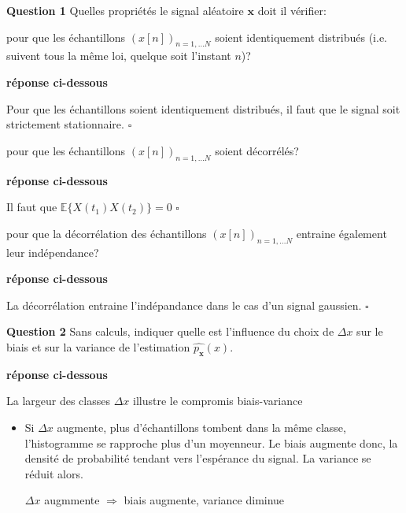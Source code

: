 \documentclass{article}
\newcommand{\debutrep}[1]{\color{blue}\begin{center} \hrulefill \textbf{ #1 } \hrulefill \end{center} }
\newcommand{\finrep}{\vspace*{5mm}\hfill $\square$\color{black}\vspace*{5mm}}
\begin{document}
\begin{list}{}{\setlength{\leftmargin}{2mm} \setlength{\labelwidth}{0mm} \setlength{\labelsep}{3mm} \setlength{\itemsep}{1mm} }
\item[\textbf{Question 1}] Quelles propriétés le signal aléatoire $\mathbf{x}$ doit il vérifier:
\begin{list}{-}{\setlength{\leftmargin}{3mm} \setlength{\labelwidth}{20mm} \setlength{\labelsep}{2mm} \setlength{\itemsep}{1mm} }
\item   pour que les échantillons  $\left(x[n]\right)_{n=1,\ldots N}$ soient identiquement distribués (i.e. suivent tous la même loi, quelque soit l'instant $n$)?

\debutrep{réponse ci-dessous}
Pour que les échantillons soient identiquement distribués, il faut que le signal soit strictement stationnaire.
\finrep

\item   pour que les échantillons  $\left(x[n]\right)_{n=1,\ldots N}$ soient décorrélés?

\debutrep{réponse ci-dessous}
Il faut que $\mathbb{E}\{X(t_1)X(t_2)\} = 0$
\finrep


\item  pour que la décorrélation des échantillons $\left(x[n]\right)_{n=1,\ldots N}$ entraine  également leur indépendance?

\debutrep{réponse ci-dessous}
La décorrélation entraine l'indépandance dans le cas d'un signal gaussien.
\finrep
 
\end{list}

\item[\textbf{Question 2}] Sans calculs, indiquer quelle est l'influence du choix de $\Delta x$ sur le biais et sur la variance de l'estimation $\widehat{p_{\mathbf{x}}}(x)$.

\debutrep{réponse ci-dessous}
La largeur des classes $\Delta x$ illustre le compromis biais-variance
\begin{itemize}
    \item Si $\Delta x$ augmente, plus d'échantillons tombent dans la même classe, l'histogramme se rapproche plus d'un moyenneur. Le biais augmente donc, la densité de probabilité tendant vers l'espérance du signal. La variance se réduit alors.
    
    \vspace*{3mm}
    \begin{center}
    
        $\Delta x$ augmmente $\Rightarrow$ biais augmente, variance diminue
    \end{center}
    \vspace*{3mm}


\end{itemize}
\end{list}
\end{document}
